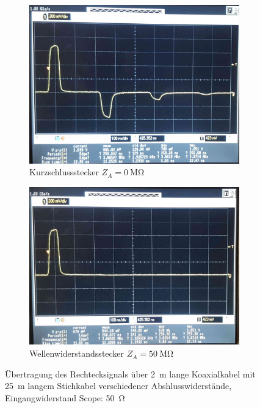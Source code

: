 \documentclass[a4paper,twoside,final]{article}
\begin{document}
\begin{figure}[htp]
    \centering
    \begin{subfigure}{0.45\textwidth}
        \includegraphics[width=\textwidth]{Bilder/Bild5.jpg}
        \caption{Kurzschlussstecker $Z_A = \SI{0}{\mega\ohm}$}
    \end{subfigure}\hspace{1cm}
    \begin{subfigure}{0.45\textwidth}
        \includegraphics[width=\textwidth]{Bilder/Bild6.jpg}
        \caption{Wellenwiderstandsstecker $Z_A = \SI{50}{\mega\ohm}$}
    \end{subfigure}
    \caption{Übertragung des Rechtecksignals über \SI{2}{\metre} lange Koaxialkabel mit \SI{25}{\metre} langem Stichkabel verschiedener Abshlusswiderstände, Eingangwiderstand Scope: \SI{50}{\ohm}}
    \label{fig:Stichkabel_Kurzschluss_Wellenwiderstand}
\end{figure}\\
\end{document}
